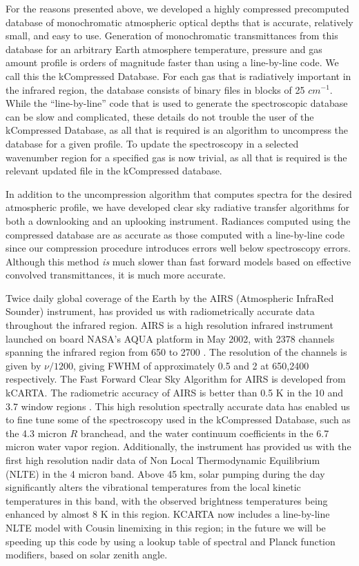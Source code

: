 \documentclass[11pt]{article}
\newcommand{\kc}{\textsf{kCARTA}\xspace}
\begin{document}
For the reasons presented above, we developed a highly compressed precomputed 
database of monochromatic atmospheric optical depths that is accurate, 
relatively small, and easy to use.  Generation of monochromatic transmittances
from this database for an arbitrary Earth atmosphere temperature, pressure 
and gas amount profile is orders of magnitude faster than using a 
line-by-line code. We call this the kCompressed Database. For each gas that
is radiatively important in the infrared region, the database 
consists of binary files in blocks of 25 $cm^{-1}$. While the ``line-by-line''
code that is used to generate the spectroscopic database can be slow and 
complicated, these details do not trouble the user of the kCompressed 
Database, as all that is required is an algorithm to uncompress the database 
for a given profile. To update the spectroscopy in a selected wavenumber 
region for a specified gas is now trivial, as all that is required is the 
relevant updated  file in the kCompressed database. 

In addition to the uncompression algorithm that computes spectra for the
desired atmospheric profile, we have developed clear sky radiative transfer 
algorithms for both a downlooking and an uplooking instrument. Radiances 
computed using the compressed database are as accurate as those computed with
a line-by-line code since our compression procedure introduces errors well 
below spectroscopy errors. Although this method {\em is} much slower than 
fast forward models based on effective convolved transmittances, it is much 
more accurate. 

Twice daily global coverage of the Earth by the AIRS (Atmospheric
InfraRed Sounder) instrument, has provided 
us with radiometrically accurate data throughout the infrared
region. AIRS is a high resolution infrared instrument launched on
board NASA's AQUA platform in May 2002, with 2378 channels spanning
the infrared region from 650 to 2700 \wn. The resolution of the
channels is given by $\nu/1200$, giving FWHM of
approximately 0.5 \wn and 2 \wn at 650,2400 \wn respectively. The Fast
Forward Clear Sky Algorithm for AIRS is developed from \kc \cite{str:02*2}.
The radiometric accuracy of AIRS is better than 0.5 K in the
10 \um and 3.7 \um window regions \cite{aum:02*2}. This high
resolution spectrally accurate data has enabled us to fine tune some
of the spectroscopy used in the kCompressed Database, such as the 4.3
micron \cd $R$ branchead, and the water
continuum coefficients in the 6.7 micron water vapor region. Additionally, 
the instrument has provided us with the first high resolution nadir data of 
Non Local Thermodynamic Equilibrium (NLTE) in the 4 micron \cd band. Above 
45 km, solar pumping during the day
significantly alters the vibrational temperatures from the local kinetic 
temperatures in this band, with the observed brightness temperatures being 
enhanced by almost 8 K in this region. \textsf{KCARTA} now includes a 
line-by-line NLTE model with Cousin linemixing in this region; in the future
we will be speeding up this code by using a lookup table of spectral and Planck
function modifiers, based on solar zenith angle.
\end{document}
